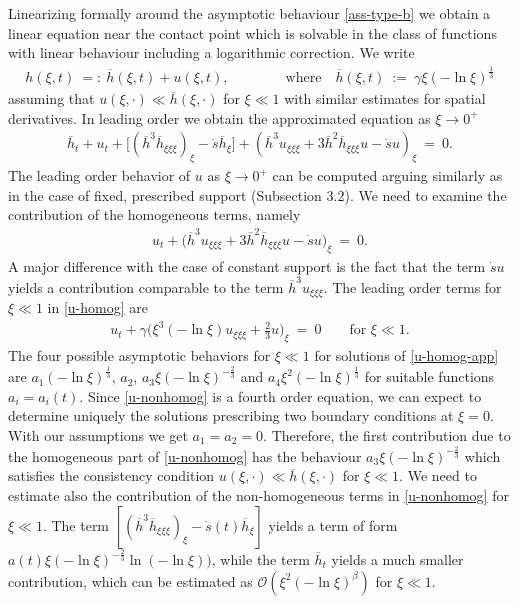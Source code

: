 \documentclass[pagesize,pdftex]{amsart}
\newcommand{\OL}[0]{\overline} %
\newcommand{\OO}{{\mathcal O}}
\begin{document}
Linearizing formally around the asymptotic behaviour \eqref{ass-type-b} we
obtain a linear equation near the contact point which is solvable in the class
of functions with linear behaviour including a logarithmic correction. We write
\begin{align}   \label{H-bar-def} %
  h(\xi,t) \ %
  =: \ \OL{h} ( \xi,t) +u( \xi,t), \qquad\qquad %
  \text{where} \quad %
  \OL{h}(\xi,t) \ %
  := \ \gamma \xi ( - \ln  \xi) ^{\frac 13}%
\end{align}%
assuming that $u(\xi,\cdot) \ll \OL{h}(\xi,\cdot)$ for $\xi \ll 1$ with
similar estimates for spatial derivatives. In leading order we obtain the
approximated equation as $\xi\to 0^+$
\begin{align}
  \OL{h}_t +u_t + \big[ ( \OL{h}^{3}\OL{h}_{\xi\xi\xi})_\xi -\dot s \OL{h}_{\xi}\big] +( \OL{h}^{3}u_{\xi\xi\xi}+3\OL{h}^{2}%
  \OL{h}_{\xi\xi\xi}u-\dot s   u)_\xi \ %
  = \ 0.  \label{u-nonhomog}
\end{align}
The leading order behavior of $u$ as $\xi\to 0^+$ can be computed arguing
similarly as in the case of fixed, prescribed support (Subsection 3.2). We need
to examine the contribution of the homogeneous terms, namely%
\begin{align}
u_t + \big( \OL{h}^{3}u_{\xi\xi\xi}+3\OL{h}^{2}\OL{h}_{\xi\xi\xi}u-\dot s  u\big)_\xi \ %
= \ 0.  \label{u-homog}
\end{align}
A major difference with the case of constant support is the fact that the term
$\dot s u$ yields a contribution comparable to the term
$\OL{h}^{3}u_{\xi\xi\xi}$. The leading order terms for $\xi\ll 1$ in
\eqref{u-homog} are%
\begin{align}
  u_t + \gamma \big( \xi^{3} (- \ln \xi) u_{\xi\xi\xi}+ \frac{2}{3}u\big)_\xi \ %
  = \ 0 \qquad %
  \text{for $\xi \ll 1$}.
\label{u-homog-app}
\end{align}
The four possible asymptotic behaviors for $\xi \ll 1$ for solutions of
\eqref{u-homog-app} are %
$a_1 (- \ln \xi) ^{\frac 13}$, $a_2$, $a_3 \xi (- \ln \xi)^{-\frac{2}{3}}$ and
$a_4 \xi^{2}(- \ln \xi)^{\frac 13}$ for suitable functions $a_i = a_i(t)$. Since
\eqref{u-nonhomog} is a fourth order equation, we can expect to determine
uniquely the solutions prescribing two boundary conditions at $\xi = 0$. With
our assumptions we get $a_1 = a_2 = 0$. Therefore, the first contribution due to
the homogeneous part of \eqref{u-nonhomog} has the behaviour
$a_3 \xi (- \ln \xi)^{-\frac{2}{3}}$ which satisfies the consistency condition
$u(\xi,\cdot) \ll \OL{h}(\xi,\cdot)$ for $\xi \ll 1$. We need to estimate also
the contribution of the non-homogeneous terms in \eqref{u-nonhomog} for
$\xi \ll 1$. The term $%
[( \OL{h}^{3}\OL{h}_{\xi\xi\xi})_\xi -\dot s (t) \OL{h}_{\xi}]$ yields a term of
form $a(t) \xi(- \ln \xi)^{-\frac{2}{3}}\ln (- \ln \xi)) $, while the term
$\OL{h}_t $ yields a much smaller contribution, which can be estimated as
$\OO(\xi^{2}(- \ln \xi) ^{\beta }) $ for $\xi \ll 1$.
\end{document}
